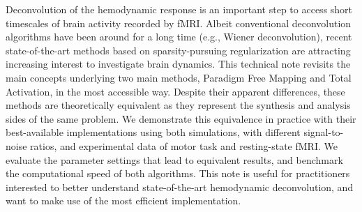 Deconvolution of the hemodynamic response is an important step to access short timescales of brain activity recorded by fMRI. Albeit conventional deconvolution algorithms have been around for a long time (e.g., Wiener deconvolution), recent state-of-the-art methods based on sparsity-pursuing regularization are attracting increasing interest to investigate brain dynamics. This technical note revisits the main concepts underlying two main methods, Paradigm Free Mapping and Total Activation, in the most accessible way. Despite their apparent differences, these methods are theoretically equivalent as they represent the synthesis and analysis sides of the same problem. We demonstrate this equivalence in practice with their best-available implementations using both simulations, with different signal-to-noise ratios, and experimental data of motor task and resting-state fMRI. We evaluate the parameter settings that lead to equivalent results, and benchmark the computational speed of both algorithms. This note is useful for practitioners interested to better understand state-of-the-art hemodynamic deconvolution, and want to make use of the most efficient implementation.